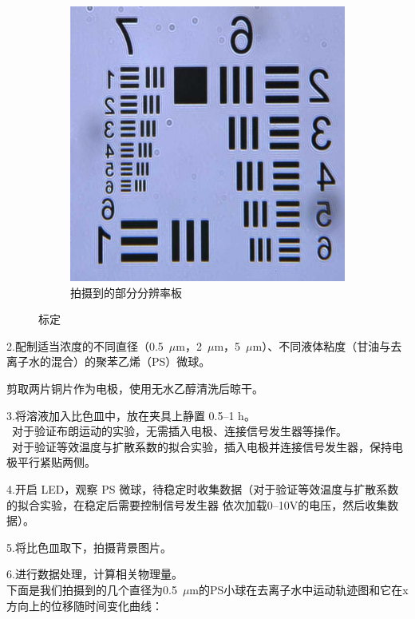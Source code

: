 \documentclass[a4paper]{report} %
\begin{document}
\begin{figure}[H]
\begin{subfigure}{0.45\textwidth}
        \includegraphics[width=\linewidth]{标定.jpg}
        \caption{拍摄到的部分分辨率板}
    \end{subfigure}

    \caption{标定}
    \label{fig:biaoding}
\end{figure}
2.配制适当浓度的不同直径（0.5~$\mu$m，2~$\mu$m，5~$\mu$m）、不同液体粘度（甘油与去离子水的混合）的聚苯乙烯（PS）微球。\par
剪取两片铜片作为电极，使用无水乙醇清洗后晾干。\par
3.将溶液加入比色皿中，放在夹具上静置 0.5--1 h。\\ 
\quad \textbullet\ 对于验证布朗运动的实验，无需插入电极、连接信号发生器等操作。 \\
\quad \textbullet\ 对于验证等效温度与扩散系数的拟合实验，插入电极并连接信号发生器，保持电极平行紧贴两侧。\par
4.开启 LED，观察 PS 微球，待稳定时收集数据（对于验证等效温度与扩散系数的拟合实验，在稳定后需要控制信号发生器
依次加载0--10V的电压，然后收集数据）。\par
5.将比色皿取下，拍摄背景图片。\par
6.进行数据处理，计算相关物理量。\\
下面是我们拍摄到的几个直径为0.5~$\mu$m的PS小球在去离子水中运动轨迹图和它在x方向上的位移随时间变化曲线：
\end{document}
